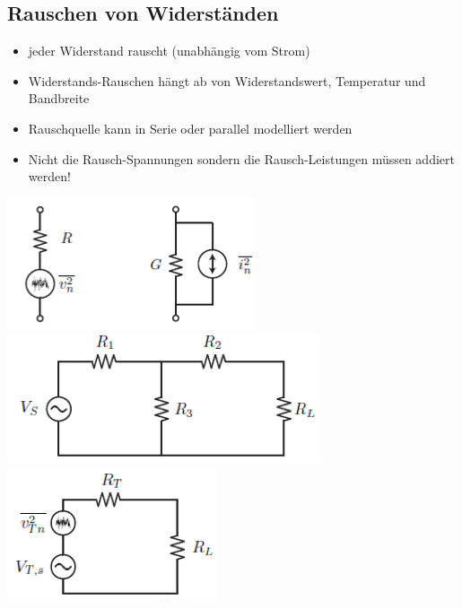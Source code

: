 \subsection{Rauschen von Widerständen}
\begin{itemize}
  \item jeder Widerstand rauscht (unabhängig vom Strom)
  \item Widerstands-Rauschen hängt ab von Widerstandswert, Temperatur und
  Bandbreite
  \item Rauschquelle kann in Serie oder parallel modelliert werden
  \item Nicht die Rausch-Spannungen sondern die Rausch-Leistungen müssen addiert
  werden!
\end{itemize}
\begin{minipage}{9cm}
\includegraphics[scale=0.6]{pictures/widerstandrauschen}\\
\includegraphics[scale=0.6]{pictures/seriewiderstand1}\\
\includegraphics[scale=0.6]{pictures/seriewiderstand2}
\end{minipage}
